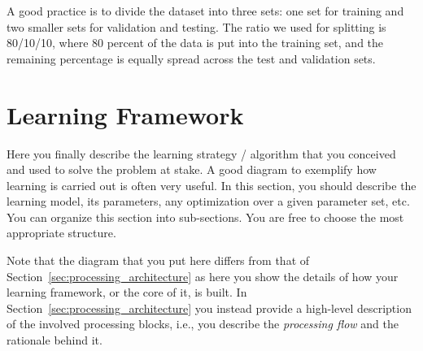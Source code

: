 A good practice is to divide the dataset into three sets: one set for training and two smaller sets for validation and testing.
The ratio we used for splitting is 80/10/10, where 80 percent of the data is put into the training set, and the remaining percentage is equally spread across the test and validation sets.



\section{Learning Framework}
\label{sec:learning_framework}

Here you finally describe the learning strategy / algorithm that you conceived and used to solve the problem at stake. A good diagram to exemplify how learning is carried out is often very useful. In this section, you should describe the learning model, its parameters, any optimization over a given parameter set, etc. You can organize this section into \mbox{sub-sections}. You are free to choose the most appropriate structure.

\begin{remark}
Note that the diagram that you put here differs from that of Section~\ref{sec:processing_architecture} as here you show the details of how your learning framework, or the core of it, is built. In Section~\ref{sec:processing_architecture} you instead provide a high-level description of the involved processing blocks, i.e., you describe the {\it processing flow} and the rationale behind it.
\end{remark}

